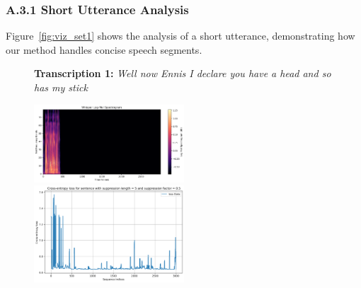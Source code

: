 \documentclass[../report.tex]{subfiles}
\begin{document}
    \subsubsection*{A.3.1 Short Utterance Analysis}
    Figure~\ref{fig:viz_set1} shows the analysis of a short utterance, demonstrating how our method handles concise speech segments.
    \begin{figure}[p]
        \centering
        \begin{minipage}{0.95\textwidth}
        \raggedright
        \textbf{Transcription 1:} \textit{Well now Ennis I declare you have a head and so has my stick}
        \end{minipage}
        
        \includegraphics[width=0.5\textwidth]{figures/mel1.png}
        \includegraphics[width=0.5\textwidth]{figures/loss_diff_sentence_1_sentence.png}

\end{figure}
\end{document}
